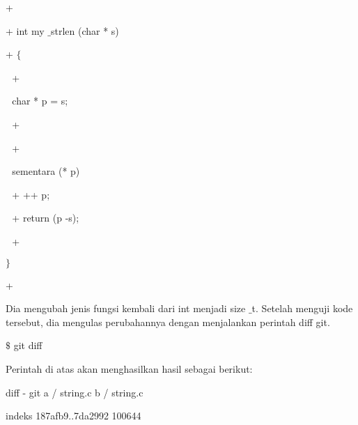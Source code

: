 \noindent 
 \hspace*{0.5in} + \par
\noindent 
 \hspace*{0.5in} + int my $  \_  $strlen (char * s) \par
\noindent 
 \hspace*{0.5in} +  $  \{  $ \par
\noindent 
 \hspace*{0.5in}  $  $ $  $ $  $+ \par
\noindent 
 \hspace*{0.5in}  $  $ $  $ $  $char * p = s; \par
\noindent 
 \hspace*{0.5in}  $  $ $  $ $  $+ \par
\noindent 
 \hspace*{0.5in}  $  $ $  $ $  $+ \par
\noindent 
 \hspace*{0.5in}  $  $ $  $ $  $sementara (* p) \par
\noindent 
 \hspace*{0.5in}  $  $ $  $ $  $+ ++ p; \par
\noindent 
 \hspace*{0.5in}  $  $ $  $ $  $+ return (p -s); \par
\noindent 
 \hspace*{0.5in}  $  $ $  $ $  $+ \par
\noindent 
 \hspace*{0.5in}  $  \}  $ \par
\noindent 
 \hspace*{0.5in} + \par
\vspace{12pt}
\noindent 
Dia mengubah jenis fungsi kembali dari int menjadi size $  \_  $t. Setelah menguji kode tersebut, dia mengulas perubahannya dengan menjalankan perintah diff git. \par
\vspace{12pt}
\vspace{12pt}
\vspace{12pt}
\noindent 
 \hspace*{0.5in}  $  \$  $ git diff \par
\noindent 
Perintah di atas akan menghasilkan hasil sebagai berikut: \par
\noindent 
 \hspace*{0.5in} diff - git a / string.c b / string.c \par
\noindent 
 \hspace*{0.5in} indeks 187afb9..7da2992 100644 \par
